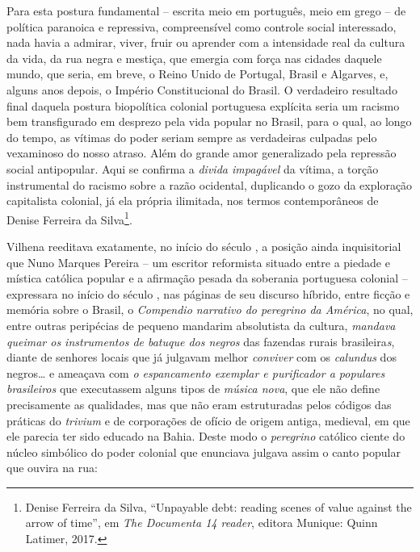 Para esta postura fundamental -- escrita meio em português, meio em
grego -- de política paranoica e repressiva, compreensível como controle
social interessado, nada havia a admirar, viver, fruir ou aprender com a
intensidade real da cultura da vida, da rua negra e mestiça, que emergia
com força nas cidades daquele mundo, que seria, em breve, o Reino Unido
de Portugal, Brasil e Algarves, e, alguns anos depois, o Império
Constitucional do Brasil. O verdadeiro resultado final daquela postura
biopolítica colonial portuguesa explícita seria um racismo bem
transfigurado em desprezo pela vida popular no Brasil, para o qual, ao
longo do tempo, as vítimas do poder seriam sempre as verdadeiras
culpadas pelo vexaminoso do nosso atraso. Além do grande amor
generalizado pela repressão social antipopular. Aqui se confirma a
\emph{divida impagável} da vítima, a torção instrumental do racismo
sobre a razão ocidental, duplicando o gozo da exploração capitalista
colonial, já ela própria ilimitada, nos termos contemporâneos de Denise
Ferreira da Silva\footnote{Denise Ferreira da Silva, ``Unpayable debt:
  reading scenes of value against the arrow of time'', em \emph{The
  Documenta 14 reader}, editora Munique: Quinn Latimer, 2017.}.

Vilhena reeditava exatamente, no início do século , a posição ainda
inquisitorial que Nuno Marques Pereira -- um escritor reformista situado
entre a piedade e mística católica popular e a afirmação pesada da
soberania portuguesa colonial -- expressara no início do século ,
nas páginas de seu discurso híbrido, entre ficção e memória sobre o
Brasil, o \emph{Compendio narrativo do peregrino da América}, no qual,
entre outras peripécias de pequeno mandarim absolutista da cultura,
\emph{mandava queimar os instrumentos de batuque dos negros} das
fazendas rurais brasileira\emph{s}, diante de senhores locais que já
julgavam melhor \emph{conviver} com os \emph{calundus} dos negros\ldots{} e
ameaçava com \emph{o espancamento exemplar e purificador a populares
brasileiros} que executassem alguns tipos de \emph{música nova}, que ele
não define precisamente as qualidades, mas que não eram estruturadas
pelos códigos das práticas do \emph{trivium} e de corporações de ofício
de origem antiga, medieval, em que ele parecia ter sido educado na
Bahia. Deste modo o \emph{peregrino} católico ciente do núcleo simbólico
do poder colonial que enunciava julgava assim o canto popular que ouvira
na rua:

